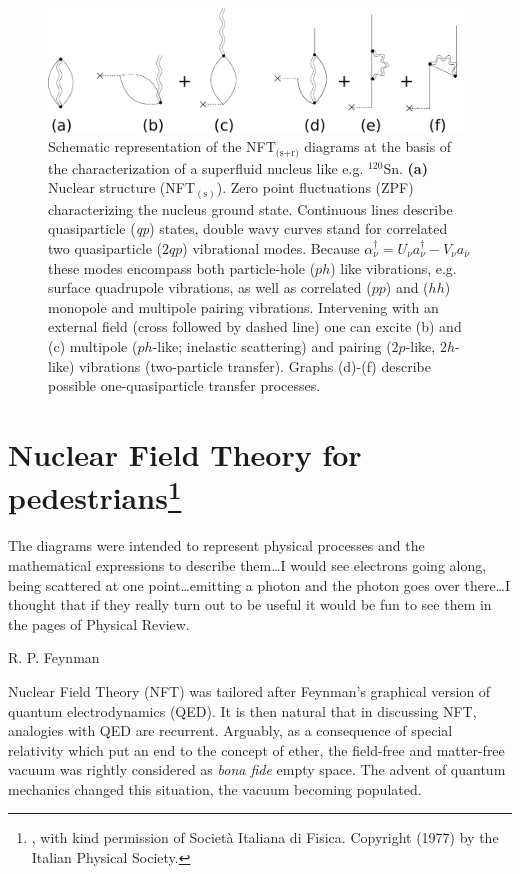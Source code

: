 \begin{figure}[h!]
\begin{center}
\includegraphics[width=11cm]{introduccion/figs/fig1_4_2.pdf}
\caption[NFT$_{\text{(s+r)}}$ diagrams at the basis of the characterization of a superfluid nucleus.]{Schematic representation of the NFT$_{\text{(s+r)}}$ diagrams at the basis of the characterization of a superfluid nucleus like e.g. $^{120}$Sn. \textbf{(a)} Nuclear structure (NFT$_{(\text{s})}$). Zero point fluctuations (ZPF) characterizing the nucleus ground state. Continuous lines describe quasiparticle (\textit{qp}) states, double wavy curves stand for correlated two quasiparticle ($2qp$) vibrational modes. Because $\alpha^{\dagger}_{\nu}=U_\nu a^\dagger_\nu-V_\nu a_{\bar{\nu}}$ these modes encompass both particle-hole ($ph$) like vibrations, e.g. surface quadrupole vibrations, as well as correlated ($pp$) and ($hh$) monopole and multipole pairing vibrations. Intervening with an external field (cross followed by dashed line) one can excite (b) and (c) multipole ($ph$-like; inelastic scattering) and  pairing ($2p$-like, $2h$-like) vibrations (two-particle transfer). Graphs (d)-(f) describe possible one-quasiparticle transfer processes.}\label{fig1.4.2}
\end{center}
\end{figure}




\FloatBarrier
\section[Nuclear Field Theory for pedestrians]{Nuclear Field Theory for pedestrians\footnote{\cite{Bes:77} , with kind permission of Societ\`a Italiana di Fisica. Copyright (1977) by the Italian Physical Society.}}\label{appintroA}
\epigraph{The diagrams were intended to represent physical processes and the mathematical expressions to describe them\dots I would see electrons going along, being scattered at one point\dots emitting a photon and the photon goes over there\dots I thought that if they really turn out to be useful it would be fun to see them in the pages of Physical Review.}{R. P. Feynman}
Nuclear Field Theory (NFT) was tailored after Feynman's graphical version of quantum electrodynamics (QED). It is then natural that in discussing NFT, analogies with QED are recurrent.   Arguably, as a consequence of special relativity which put an end to the concept of ether, the field-free and matter-free vacuum was rightly considered as \textit{bona fide} empty space. The advent of quantum mechanics changed this situation,  the vacuum becoming populated.

